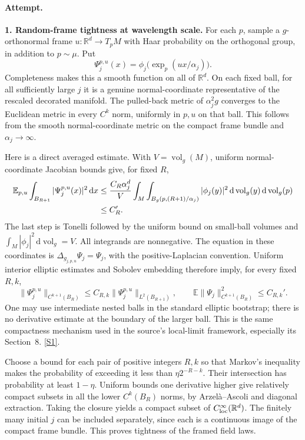 \documentclass[11pt,a4paper]{article}
\newcommand{\R}{\mathbb{R}}
\newcommand{\E}{\mathbb{E}}
\newcommand{\dd}{\,\mathrm d}
\newcommand{\sref}[2]{\hyperlink{source:#1:#2}{[S#2]}}
\numberwithin{equation}{section}
\begin{document}
\paragraph{Attempt.}
\textbf{1. Random-frame tightness at wavelength scale.}
For each $p$, sample a $g$-orthonormal frame $u:\R^d\to T_pM$ with Haar
probability on the orthogonal group, in addition to $p\sim\mu$. Put
\[
 \Psi_j^{p,u}(x)=\phi_j\bigl(\exp_p(u x/\alpha_j)\bigr).
\]
Completeness makes this a smooth function on all of $\R^d$. On each fixed
ball, for all sufficiently large $j$ it is a genuine normal-coordinate
representative of the rescaled decorated manifold. The pulled-back
metric of $\alpha_j^2g$ converges to the Euclidean metric in every
$C^k$ norm, uniformly in $p,u$ on that ball. This follows from the smooth
normal-coordinate metric on the compact frame bundle and
$\alpha_j\to\infty$.

Here is a direct averaged estimate. With $V=\operatorname{vol}_g(M)$,
uniform normal-coordinate Jacobian bounds give, for fixed $R$,
\begin{align}
 \E_{p,u}\int_{B_{R+1}}|\Psi_j^{p,u}(x)|^2\dd x
 &\leq \frac{C_R\alpha_j^d}{V}
       \int_M\int_{B_g(p,(R+1)/\alpha_j)}|\phi_j(y)|^2
                                      \dd\operatorname{vol}_g(y)
                                      \dd\operatorname{vol}_g(p)
       \notag\\
 &\leq C_R'.\label{statement:average}
\end{align}
The last step is Tonelli followed by the uniform bound on small-ball
volumes and $\int_M|\phi_j|^2\dd\operatorname{vol}_g=V$.
All integrands are nonnegative. The equation in these coordinates is
$\Delta_{g_{j,p,u}}\Psi_j=\Psi_j$, with the positive-Laplacian
convention. Uniform interior elliptic estimates and Sobolev embedding
therefore imply, for every fixed $R,k$,
\begin{equation}\label{statement:regularity}
 \|\Psi_j^{p,u}\|_{C^{k+1}(B_R)}
       \leq C_{R,k}\|\Psi_j^{p,u}\|_{L^2(B_{R+1})},\qquad
 \E\|\Psi_j\|_{C^{k+1}(B_R)}^2\leq C_{R,k}'.
\end{equation}
One may use intermediate nested balls in the standard elliptic bootstrap;
there is no derivative estimate at the boundary of the larger ball.
This is the same compactness mechanism used in the source's local-limit
framework, especially its Section~8. \sref{statement}{1}.

Choose a bound for each pair of positive integers $R,k$ so that Markov's
inequality makes the probability of exceeding it less than
$\eta 2^{-R-k}$. Their intersection has probability at least $1-\eta$.
Uniform bounds one derivative higher give relatively compact subsets in
all the lower $C^k(B_R)$ norms, by Arzel\`a--Ascoli and diagonal extraction.
Taking the closure yields a compact subset of $C^\infty_{\rm loc}(\R^d)$.
The finitely many initial $j$ can be included separately, since each is
a continuous image of the compact frame bundle. This proves tightness
of the framed field laws.
\end{document}
